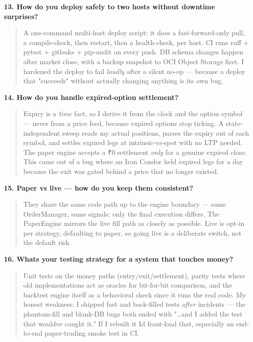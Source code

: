 \documentclass[11pt]{article}
\begin{document}
\textbf{13. How do you deploy safely to two hosts without downtime surprises?}

\begin{quote}
A one-command multi-host deploy script: it does a fast-forward-only pull, a compile-check, then
restart, then a health-check, per host. CI runs ruff + pytest + gitleaks + pip-audit on every
push. DB schema changes happen after market close, with a backup snapshot to OCI Object Storage
first. I hardened the deploy to fail \emph{loudly} after a silent no-op --- because a deploy that
"succeeds" without actually changing anything is its own bug.
\end{quote}

\textbf{14. How do you handle expired-option settlement?}

\begin{quote}
Expiry is a \emph{time} fact, so I derive it from the clock and the option symbol --- never from a
price feed, because expired options stop ticking. A state-independent sweep reads my actual
positions, parses the expiry out of each symbol, and settles expired legs at intrinsic-vs-spot
with no LTP needed. The paper engine accepts a ₹0 settlement \emph{only} for a genuine expired close.
This came out of a bug where an Iron Condor held expired legs for a day because the exit was
gated behind a price that no longer existed.
\end{quote}

\textbf{15. Paper vs live --- how do you keep them consistent?}

\begin{quote}
They share the same code path up to the engine boundary --- same OrderManager, same signals; only
the final execution differs. The PaperEngine mirrors the live fill path as closely as possible.
Live is opt-in per strategy, defaulting to paper, so going live is a deliberate switch, not the
default risk.
\end{quote}

\textbf{16. What\textquotesingle s your testing strategy for a system that touches money?}

\begin{quote}
Unit tests on the money paths (entry/exit/settlement), parity tests where old implementations
act as oracles for bit-for-bit comparison, and the backtest engine itself as a behavioral check
since it runs the real code. My honest weakness: I shipped fast and back-filled tests \emph{after}
incidents --- the phantom-fill and blank-DB bugs both ended with "\ldots and I added the test that
would\textquotesingle ve caught it." If I rebuilt it I\textquotesingle d front-load that, especially an end-to-end paper-trading
smoke test in CI.
\end{quote}
\end{document}
